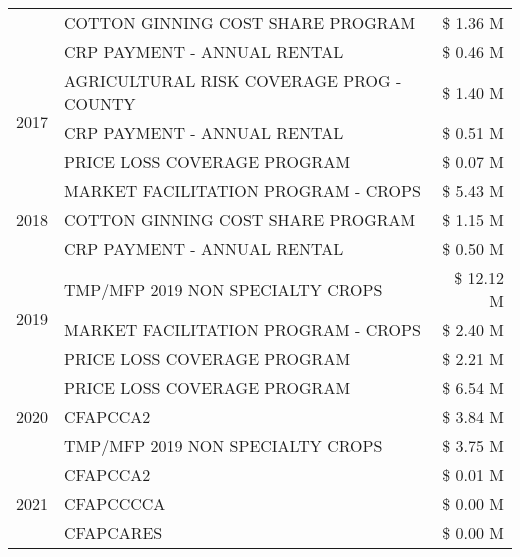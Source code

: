 \begin{tabular}{llr}
 & COTTON GINNING COST SHARE PROGRAM & \$ 1.36 M \\
 & CRP PAYMENT - ANNUAL RENTAL & \$ 0.46 M \\
\cline{1-3}
\multirow[t]{3}{*}{2017} & AGRICULTURAL RISK COVERAGE PROG - COUNTY & \$ 1.40 M \\
 & CRP PAYMENT - ANNUAL RENTAL & \$ 0.51 M \\
 & PRICE LOSS COVERAGE PROGRAM & \$ 0.07 M \\
\cline{1-3}
\multirow[t]{3}{*}{2018} & MARKET FACILITATION PROGRAM - CROPS & \$ 5.43 M \\
 & COTTON GINNING COST SHARE PROGRAM & \$ 1.15 M \\
 & CRP PAYMENT - ANNUAL RENTAL & \$ 0.50 M \\
\cline{1-3}
\multirow[t]{3}{*}{2019} & TMP/MFP 2019 NON SPECIALTY CROPS & \$ 12.12 M \\
 & MARKET FACILITATION PROGRAM - CROPS & \$ 2.40 M \\
 & PRICE LOSS COVERAGE PROGRAM & \$ 2.21 M \\
\cline{1-3}
\multirow[t]{3}{*}{2020} & PRICE LOSS COVERAGE PROGRAM & \$ 6.54 M \\
 & CFAPCCA2 & \$ 3.84 M \\
 & TMP/MFP 2019 NON SPECIALTY CROPS & \$ 3.75 M \\
\cline{1-3}
\multirow[t]{3}{*}{2021} & CFAPCCA2 & \$ 0.01 M \\
 & CFAPCCCCA & \$ 0.00 M \\
 & CFAPCARES & \$ 0.00 M \\
\cline{1-3}
\bottomrule
\end{tabular}
